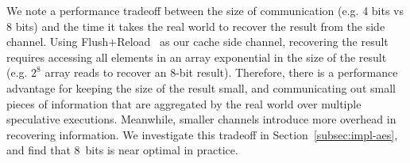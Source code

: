 We note a performance tradeoff between the size of communication (e.g. 4 bits vs
8 bits) and the time it takes the real world to recover the result from the side
channel. Using Flush+Reload~\cite{yarom2014flush+} as our cache side channel,
recovering the result requires accessing all elements in an array exponential in
the size of the result (e.g. $2^8$ array reads to recover an 8-bit result).
Therefore, there is a performance advantage for keeping the size of the result
small, and communicating out small pieces of information that are aggregated by
the real world over multiple speculative executions. Meanwhile, smaller channels
introduce more overhead in recovering information. We investigate this tradeoff
in Section~\ref{subsec:impl-aes}, and find that 8~bits is near optimal in
practice.


